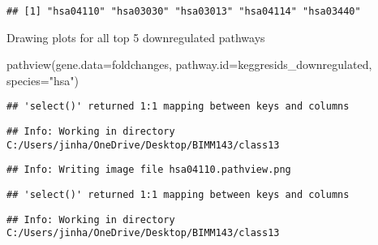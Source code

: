 \documentclass[
]{article}
\newenvironment{Shaded}{\begin{snugshade}}{\end{snugshade}}
\newcommand{\AttributeTok}[1]{\textcolor[rgb]{0.77,0.63,0.00}{#1}}
\newcommand{\DecValTok}[1]{\textcolor[rgb]{0.00,0.00,0.81}{#1}}
\newcommand{\FunctionTok}[1]{\textcolor[rgb]{0.00,0.00,0.00}{#1}}
\newcommand{\NormalTok}[1]{#1}
\newcommand{\OtherTok}[1]{\textcolor[rgb]{0.56,0.35,0.01}{#1}}
\newcommand{\SpecialCharTok}[1]{\textcolor[rgb]{0.00,0.00,0.00}{#1}}
\newcommand{\StringTok}[1]{\textcolor[rgb]{0.31,0.60,0.02}{#1}}
\begin{document}
\begin{Shaded}
\end{Shaded}

\begin{verbatim}
## [1] "hsa04110" "hsa03030" "hsa03013" "hsa04114" "hsa03440"
\end{verbatim}

Drawing plots for all top 5 downregulated pathways

\begin{Shaded}
\begin{Highlighting}[]
\FunctionTok{pathview}\NormalTok{(}\AttributeTok{gene.data=}\NormalTok{foldchanges, }\AttributeTok{pathway.id=}\NormalTok{keggresids\_downregulated, }\AttributeTok{species=}\StringTok{"hsa"}\NormalTok{)}
\end{Highlighting}
\end{Shaded}

\begin{verbatim}
## 'select()' returned 1:1 mapping between keys and columns
\end{verbatim}

\begin{verbatim}
## Info: Working in directory C:/Users/jinha/OneDrive/Desktop/BIMM143/class13
\end{verbatim}

\begin{verbatim}
## Info: Writing image file hsa04110.pathview.png
\end{verbatim}

\begin{verbatim}
## 'select()' returned 1:1 mapping between keys and columns
\end{verbatim}

\begin{verbatim}
## Info: Working in directory C:/Users/jinha/OneDrive/Desktop/BIMM143/class13
\end{verbatim}
\end{document}

